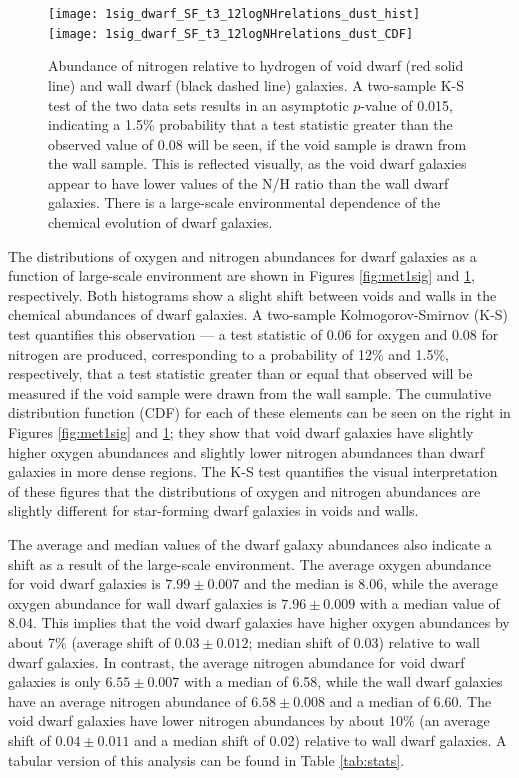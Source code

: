 \begin{figure}
    \centering
    \texttt{[image: 1sig\_dwarf\_SF\_t3\_12logNHrelations\_dust\_hist]}
    \texttt{[image: 1sig\_dwarf\_SF\_t3\_12logNHrelations\_dust\_CDF]}
    \caption{Abundance of nitrogen relative to hydrogen of void dwarf (red solid 
    line) and wall dwarf (black dashed line) galaxies.  A two-sample K-S test of 
    the two data sets results in an asymptotic $p$-value of 0.015, indicating a 
    1.5\% probability that a test statistic greater than the observed value of 
    0.08 will be seen, if the void sample is drawn from the wall sample.  This 
    is reflected visually, as the void dwarf galaxies appear to have lower 
    values of the N/H ratio than the wall dwarf galaxies.  There is a 
    large-scale environmental dependence of the chemical evolution of dwarf 
    galaxies.}
    \label{fig:N_1sig}
\end{figure}

The distributions of oxygen and nitrogen abundances for dwarf galaxies as a 
function of large-scale environment are shown in Figures \ref{fig:met1sig} and 
\ref{fig:N_1sig}, respectively.  Both histograms show a slight shift between 
voids and walls in the chemical abundances of dwarf galaxies.  A two-sample 
Kolmogorov-Smirnov (K-S) test quantifies this observation --- a test statistic 
of 0.06 for oxygen and 0.08 for nitrogen are produced, corresponding to a 
probability of 12\% and 1.5\%, respectively, that a test statistic greater than 
or equal that observed will be measured if the void sample were drawn from the 
wall sample.  The cumulative distribution function (CDF) for each of these 
elements can be seen on the right in Figures \ref{fig:met1sig} and 
\ref{fig:N_1sig}; they show that void dwarf galaxies have slightly higher oxygen 
abundances and slightly lower nitrogen abundances than dwarf galaxies in more 
dense regions.  The K-S test quantifies the visual interpretation of these 
figures that the distributions of oxygen and nitrogen abundances are slightly 
different for star-forming dwarf galaxies in voids and walls.

The average and median values of the dwarf galaxy abundances also indicate a 
shift as a result of the large-scale environment.  The average oxygen abundance 
for void dwarf galaxies is $7.99\pm 0.007$ and the median is 8.06, while the 
average oxygen abundance for wall dwarf galaxies is $7.96\pm 0.009$ with a 
median value of 8.04.  This implies that the void dwarf galaxies have higher 
oxygen abundances by about 7\% (average shift of $0.03\pm 0.012$; median shift 
of 0.03) relative to wall dwarf galaxies.  In contrast, the average nitrogen 
abundance for void dwarf galaxies is only $6.55\pm 0.007$ with a median of 6.58, 
while the wall dwarf galaxies have an average nitrogen abundance of 
$6.58\pm 0.008$ and a median of 6.60.  The void dwarf galaxies have lower 
nitrogen abundances by about 10\% (an average shift of $0.04\pm 0.011$ and a 
median shift of 0.02) relative to wall dwarf galaxies.  A tabular version of 
this analysis can be found in Table \ref{tab:stats}.


